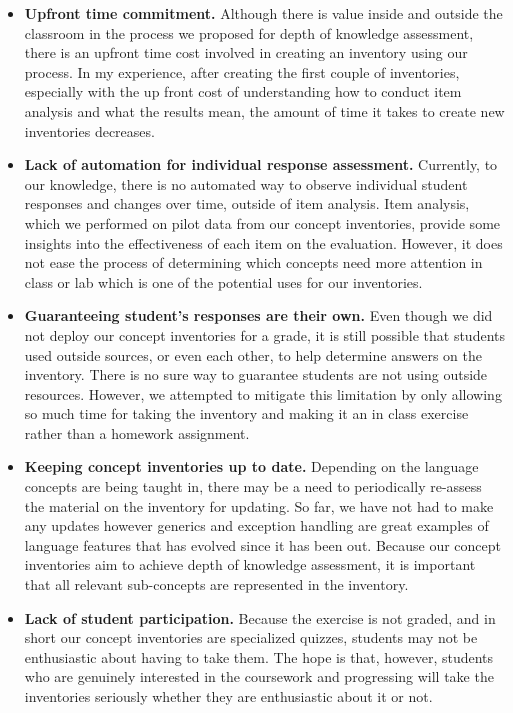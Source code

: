 \begin{itemize}
	\item \textbf{Upfront time commitment.} Although there is value inside and outside the classroom in the process we proposed for depth of knowledge assessment, there is an upfront time cost involved in creating an inventory using our process. In my experience, after creating the first couple of inventories, especially with the up front cost of understanding how to conduct item analysis and what the results mean, the amount of time it takes to create new inventories decreases.
	\item \textbf{Lack of automation for individual response assessment.} Currently, to our knowledge, there is no automated way to observe individual student responses and changes over time, outside of item analysis. Item analysis, which we performed on pilot data from our concept inventories, provide some insights into the effectiveness of each item on the evaluation. However, it does not ease the process of determining which concepts need more attention in class or lab which is one of the potential uses for our inventories.
	\item \textbf{Guaranteeing student's responses are their own.} Even though we did not deploy our concept inventories for a grade, it is still possible that students used outside sources, or even each other, to help determine answers on the inventory. There is no sure way to guarantee students are not using outside resources. However, we attempted to mitigate this limitation by only allowing so much time for taking the inventory and making it an in class exercise rather than a homework assignment.
	\item \textbf{Keeping concept inventories up to date.} Depending on the language concepts are being taught in, there may be a need to periodically re-assess the material on the inventory for updating. So far, we have not had to make any updates however generics and exception handling are great examples of language features that has evolved since it has been out. Because our concept inventories aim to achieve depth of knowledge assessment, it is important that all relevant sub-concepts are represented in the inventory.
	\item \textbf{Lack of student participation.} Because the exercise is not graded, and in short our concept inventories are specialized quizzes, students may not be enthusiastic about having to take them. The hope is that, however, students who are genuinely interested in the coursework and progressing will take the inventories seriously whether they are enthusiastic about it or not.

\end{itemize}
